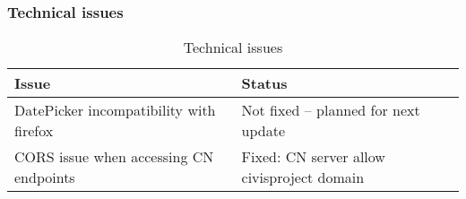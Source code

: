 \subsubsection{Technical issues}
 
\begin{table}[h!]
\caption{Technical issues}\label{tab:app_nav}
\begin{center} \footnotesize 
\begin{tabular}{ l p{6cm}}
\hline
\textbf{Issue}  &
\textbf{Status}  \\ \hline

DatePicker incompatibility with firefox
  & 
Not fixed -- planned for next update\\ 
CORS issue when accessing CN endpoints & Fixed: CN server allow civisproject domain \\ 
 \hline
\end{tabular}
\end{center} 
\end{table}